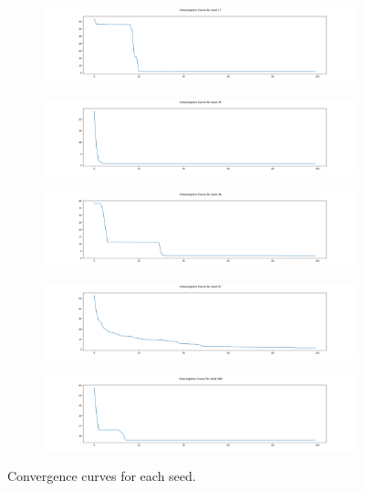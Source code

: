 \documentclass{article}
\begin{document}
\begin{figure}[h!]
	\centering
	\begin{subfigure}[b]{\linewidth}
		\includegraphics[width=\linewidth]{ccgp_curve_17.png}
	\end{subfigure}
	\begin{subfigure}[b]{\linewidth}
		\includegraphics[width=\linewidth]{ccgp_curve_35.png}
	\end{subfigure}
	\begin{subfigure}[b]{\linewidth}
		\includegraphics[width=\linewidth]{ccgp_curve_36.png}
	\end{subfigure}
	\begin{subfigure}[b]{\linewidth}
		\includegraphics[width=\linewidth]{ccgp_curve_47.png}
	\end{subfigure}
	\begin{subfigure}[b]{\linewidth}
		\includegraphics[width=\linewidth]{ccgp_curve_162.png}
	\end{subfigure}
	\caption{Convergence curves for each seed.}
\end{figure}
\end{document}
